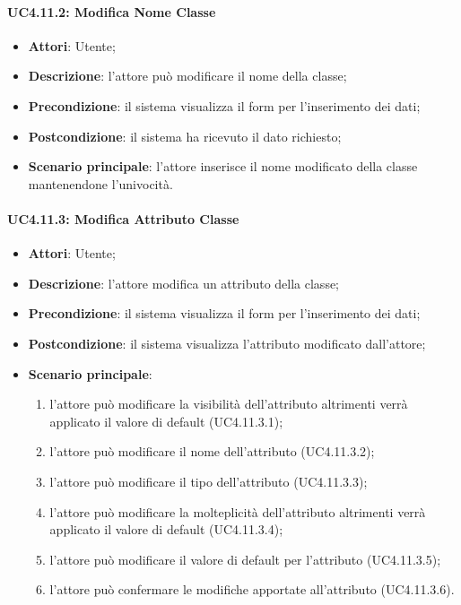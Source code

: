 \begin{itemize}
\begin{itemize}
\begin{itemize}
\begin{itemize}
\paragraph{UC4.11.2: Modifica Nome Classe}
\label{UC4.11.2}
\begin{itemize}
	\item \textbf{Attori}: Utente;
	\item \textbf{Descrizione}: l'attore può modificare il nome della classe;
	\item \textbf{Precondizione}: il sistema visualizza il form per l'inserimento dei dati;
	\item \textbf{Postcondizione}: il sistema ha ricevuto il dato richiesto;
	\item \textbf{Scenario principale}:	l'attore inserisce il nome modificato della classe mantenendone l'univocità.
\end{itemize}

\paragraph{UC4.11.3: Modifica Attributo Classe}
\label{UC4.11.3}
\begin{itemize}
	\item \textbf{Attori}: Utente;
	\item \textbf{Descrizione}: l'attore modifica un attributo della classe;
	\item \textbf{Precondizione}: il sistema visualizza il form per l'inserimento dei dati;
	\item \textbf{Postcondizione}: il sistema visualizza l'attributo modificato dall'attore;
	\item \textbf{Scenario principale}:
	\begin{enumerate}
	\item l'attore può modificare la visibilità dell'attributo altrimenti verrà applicato il valore di default (UC4.11.3.1);
	\item l'attore può modificare il nome dell'attributo (UC4.11.3.2);
	\item l'attore può modificare il tipo dell'attributo (UC4.11.3.3);
	\item l'attore può modificare la molteplicità dell'attributo altrimenti verrà applicato il valore di default (UC4.11.3.4);
	\item l'attore può modificare il valore di default per l'attributo (UC4.11.3.5);
	\item l'attore può confermare le modifiche apportate all'attributo (UC4.11.3.6).
	\end{enumerate}
\end{itemize}


\end{itemize}
\end{itemize}
\end{itemize}
\end{itemize}
